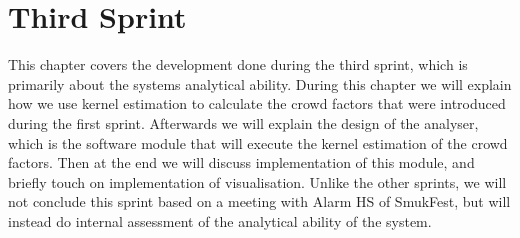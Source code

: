 \chapter{Third Sprint}\label{ch:sprint3}

This chapter covers the development done during the third sprint, which is primarily about the systems analytical ability. During this chapter we will explain how we use kernel estimation to calculate the crowd factors that were introduced during the first sprint. Afterwards we will explain the design of the analyser, which is the software module that will execute the kernel estimation of the crowd factors. Then at the end we will discuss implementation of this module, and briefly touch on implementation of visualisation. Unlike the other sprints, we will not conclude this sprint based on a meeting with Alarm HS of SmukFest, but will instead do internal assessment of the analytical ability of the system.









